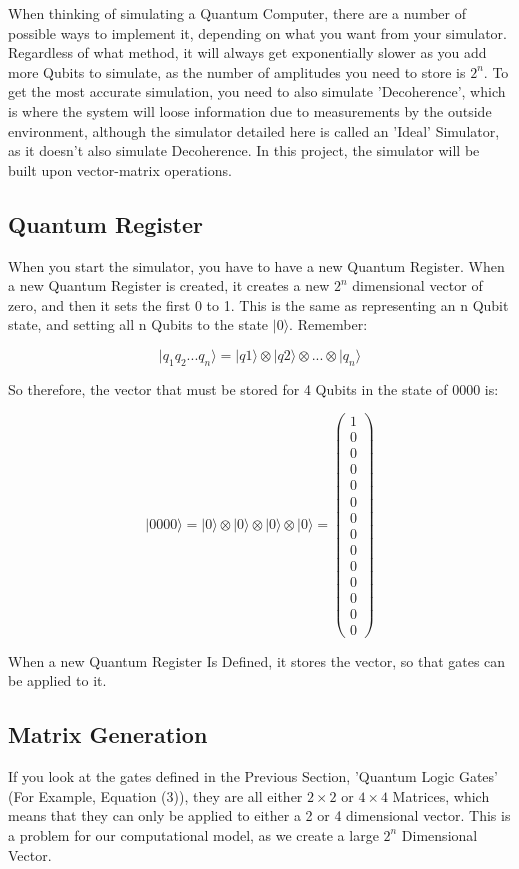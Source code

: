 \documentclass[../main.tex]{subfiles}
\begin{document}
When thinking of simulating a Quantum Computer, there are a number of possible ways to implement it, depending on what you want from your simulator.
Regardless of what method, it will always get exponentially slower as you add more Qubits to simulate, as the number of amplitudes you need to store is \(2^n\). 
To get the most accurate simulation, you need to also simulate 'Decoherence', which is where the system will loose information due to measurements by the outside environment, although the simulator detailed here is called an 'Ideal' Simulator, as it doesn't also simulate Decoherence.
In this project, the simulator will be built upon vector-matrix operations.

\subsection{Quantum Register}
When you start the simulator, you have to have a new Quantum Register. When a new Quantum Register is created, it creates a new \(2^n\) dimensional vector of zero, and then it sets the first 0 to 1. This is the same as representing an n Qubit state, and setting all n Qubits to the state \(\lvert0\rangle\). Remember:

$$
\lvert q_1 q_2...q_n \rangle = \lvert q1 \rangle \otimes \lvert q2 \rangle \otimes ... \otimes \lvert q_n \rangle
$$

So therefore, the vector that must be stored for 4 Qubits in the state of 0000 is:

$$
\lvert0000\rangle = \lvert0\rangle \otimes \lvert0\rangle \otimes \lvert0\rangle \otimes \lvert0\rangle = \left( \begin{matrix} 1 \\ 0 \\ 0 \\ 0 \\ 0 \\ 0 \\ 0 \\ 0 \\ 0 \\ 0 \\ 0 \\ 0 \\ 0 \\ 0 \end{matrix} \right)
$$

When a new Quantum Register Is Defined, it stores the vector, so that gates can be applied to it.

\subsection{Matrix Generation}
If you look at the gates defined in the Previous Section, 'Quantum Logic Gates' (For Example, Equation (3)), they are all either \(2\times2\) or \(4\times4\) Matrices, which means that they can only be applied to either a 2 or 4 dimensional vector. This is a problem for our computational model, as we create a large \(2^n\) Dimensional Vector.
\end{document}
